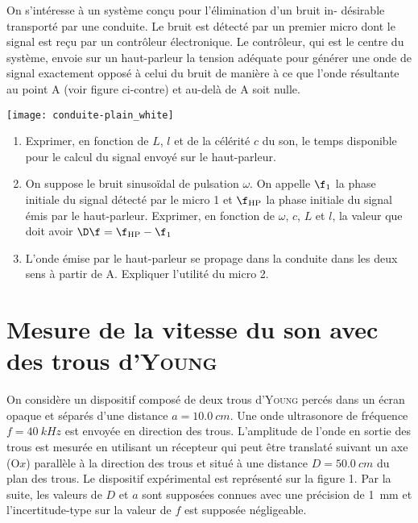 \documentclass[a4paper, 12pt, final, garamond]{book}
\begin{document}
\begin{minipage}{0.70\linewidth}
    On s'intéresse à un système conçu pour l'élimination d'un bruit in-
    désirable transporté par une conduite. Le bruit est détecté par un premier
    micro dont le signal est reçu par un contrôleur électronique. Le contrôleur,
    qui est le centre du système, envoie sur un haut-parleur la tension adéquate
    pour générer une onde de signal exactement opposé à celui du bruit de
    manière à ce que l'onde résultante au point A (voir figure ci-contre) et
    au-delà de A soit nulle.
\end{minipage}
\hfill
\begin{minipage}{0.30\linewidth}
    \begin{center}
        \texttt{[image: conduite-plain\_white]}
    \end{center}
\end{minipage}

\begin{enumerate}
    \item Exprimer, en fonction de $L$, $l$ et de la célérité $c$ du son, le
        temps disponible pour le calcul du signal envoyé sur le haut-parleur.
    \item On suppose le bruit sinusoïdal de pulsation $\omega$. On appelle
        $\f_1$ la phase initiale du signal détecté par le micro 1 et $\f_{\rm
        HP}$ la phase initiale du signal émis par le haut-parleur. Exprimer, en
        fonction de $\omega$, $c$, $L$ et $l$, la valeur que doit avoir $\D\f =
        \f_{\rm HP} - \f_1$
    \item L'onde émise par le haut-parleur se propage dans la conduite dans les
        deux sens à partir de A. Expliquer l'utilité du micro 2.
\end{enumerate}

\section{Mesure de la vitesse du son avec des trous d'\textsc{Young}}

On considère un dispositif composé de deux trous d'\textsc{Young} percés dans un
écran opaque et séparés d'une distance $a = \SI{10.0}{cm}$. Une onde ultrasonore
de fréquence $f = \SI{40}{kHz}$ est envoyée en direction des trous. L'amplitude
de l'onde en sortie des trous est mesurée en utilisant un récepteur qui peut
être translaté suivant un axe (O$x$) parallèle à la direction des trous et situé
à une distance $D = \SI{50.0}{cm}$ du plan des trous. Le dispositif expérimental
est représenté sur la figure 1. Par la suite, les valeurs de $D$ et $a$ sont
supposées connues avec une précision de \SI{1}{mm} et l'incertitude-type sur la
valeur de $f$ est supposée négligeable.
\end{document}
